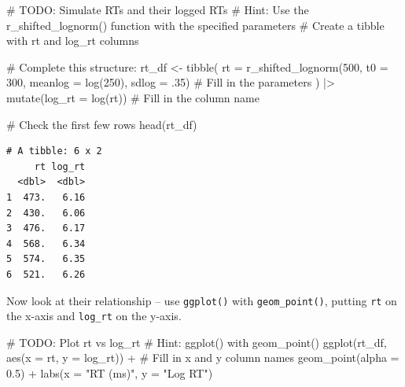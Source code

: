 \documentclass[
  letterpaper,
  DIV=11,
  numbers=noendperiod]{scrartcl}
\newenvironment{Shaded}{\begin{snugshade}}{\end{snugshade}}
\newcommand{\AlertTok}[1]{\textcolor[rgb]{0.68,0.00,0.00}{#1}}
\newcommand{\AttributeTok}[1]{\textcolor[rgb]{0.40,0.45,0.13}{#1}}
\newcommand{\CommentTok}[1]{\textcolor[rgb]{0.37,0.37,0.37}{#1}}
\newcommand{\DecValTok}[1]{\textcolor[rgb]{0.68,0.00,0.00}{#1}}
\newcommand{\FloatTok}[1]{\textcolor[rgb]{0.68,0.00,0.00}{#1}}
\newcommand{\FunctionTok}[1]{\textcolor[rgb]{0.28,0.35,0.67}{#1}}
\newcommand{\NormalTok}[1]{\textcolor[rgb]{0.00,0.23,0.31}{#1}}
\newcommand{\OtherTok}[1]{\textcolor[rgb]{0.00,0.23,0.31}{#1}}
\newcommand{\SpecialCharTok}[1]{\textcolor[rgb]{0.37,0.37,0.37}{#1}}
\newcommand{\StringTok}[1]{\textcolor[rgb]{0.13,0.47,0.30}{#1}}
\begin{document}
\begin{Shaded}
\begin{Highlighting}[]
\CommentTok{\# }\AlertTok{TODO}\CommentTok{: Simulate RTs and their logged RTs}
\CommentTok{\# Hint: Use the r\_shifted\_lognorm() function with the specified parameters}
\CommentTok{\# Create a tibble with rt and log\_rt columns}

\CommentTok{\# Complete this structure:}
\NormalTok{rt\_df }\OtherTok{\textless{}{-}} \FunctionTok{tibble}\NormalTok{(}
  \AttributeTok{rt =} \FunctionTok{r\_shifted\_lognorm}\NormalTok{(}\DecValTok{500}\NormalTok{, }\AttributeTok{t0 =} \DecValTok{300}\NormalTok{, }\AttributeTok{meanlog =} \FunctionTok{log}\NormalTok{(}\DecValTok{250}\NormalTok{), }\AttributeTok{sdlog =}\NormalTok{ .}\DecValTok{35}\NormalTok{)  }\CommentTok{\# Fill in the parameters}
\NormalTok{) }\SpecialCharTok{|\textgreater{}}
  \FunctionTok{mutate}\NormalTok{(}\AttributeTok{log\_rt =} \FunctionTok{log}\NormalTok{(rt))  }\CommentTok{\# Fill in the column name}

\CommentTok{\# Check the first few rows}
\FunctionTok{head}\NormalTok{(rt\_df)}
\end{Highlighting}
\end{Shaded}

\begin{verbatim}
# A tibble: 6 x 2
     rt log_rt
  <dbl>  <dbl>
1  473.   6.16
2  430.   6.06
3  476.   6.17
4  568.   6.34
5  574.   6.35
6  521.   6.26
\end{verbatim}

Now look at their relationship -- use \texttt{ggplot()} with
\texttt{geom\_point()}, putting \texttt{rt} on the x-axis and
\texttt{log\_rt} on the y-axis.

\begin{Shaded}
\begin{Highlighting}[]
\CommentTok{\# }\AlertTok{TODO}\CommentTok{: Plot rt vs log\_rt}
\CommentTok{\# Hint: ggplot() with geom\_point()}
\FunctionTok{ggplot}\NormalTok{(rt\_df, }\FunctionTok{aes}\NormalTok{(}\AttributeTok{x =}\NormalTok{ rt, }\AttributeTok{y =}\NormalTok{ log\_rt)) }\SpecialCharTok{+}  \CommentTok{\# Fill in x and y column names}
  \FunctionTok{geom\_point}\NormalTok{(}\AttributeTok{alpha =} \FloatTok{0.5}\NormalTok{) }\SpecialCharTok{+}
  \FunctionTok{labs}\NormalTok{(}\AttributeTok{x =} \StringTok{"RT (ms)"}\NormalTok{, }\AttributeTok{y =} \StringTok{"Log RT"}\NormalTok{)}
\end{Highlighting}
\end{Shaded}
\end{document}
